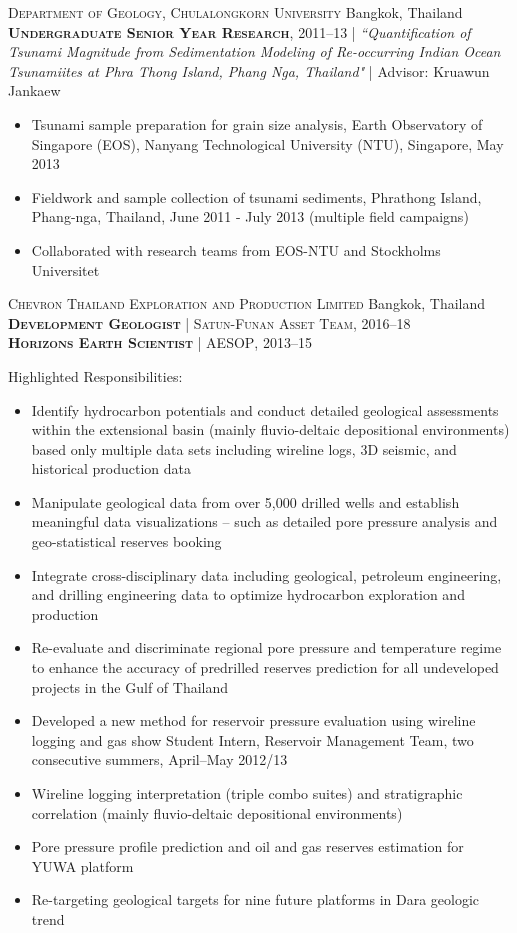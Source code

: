 \documentclass[10pt, letter]{article}
\newcommand{\margintext}[1]{\marginnote{\normalsize\textbf #1 |}}
\begin{document}
\bigskip
\textsc{Department of Geology, Chulalongkorn University} \hfill Bangkok, Thailand \\
\textsc{\textbf{Undergraduate Senior Year Research}}, 2011–13 | \textit{``Quantification of Tsunami Magnitude from Sedimentation Modeling of Re-occurring Indian Ocean Tsunamiites at Phra Thong Island, Phang Nga, Thailand"} | Advisor: Kruawun Jankaew
\begin{itemize}[leftmargin=*]
    \item Tsunami sample preparation for grain size analysis, Earth Observatory of Singapore (EOS), Nanyang Technological University (NTU), Singapore, May 2013
    \item Fieldwork and sample collection of tsunami sediments, Phrathong Island, Phang-nga, Thailand, June 2011 - July 2013 (multiple field campaigns)
    \item Collaborated with research teams from EOS-NTU and Stockholms Universitet
\end{itemize}  

\bigskip
\margintext{Professional Experience}
\textsc{Chevron Thailand Exploration and Production Limited} \hfill Bangkok, Thailand \\
\textsc{\textbf{Development Geologist}} | \textsc{Satun-Funan Asset Team}, 2016–18 \\
\textsc{\textbf{Horizons Earth Scientist}} | \textsc{AESOP}, 2013–15

\bigskip
Highlighted Responsibilities:
\begin{itemize}[leftmargin=*]
    \item Identify hydrocarbon potentials and conduct detailed geological assessments within the extensional basin (mainly fluvio-deltaic depositional environments) based only multiple data sets including wireline logs, 3D seismic, and historical production data
    \item Manipulate geological data from over 5,000 drilled wells and establish meaningful data visualizations – such as detailed pore pressure analysis and geo-statistical reserves booking
    \item Integrate cross-disciplinary data including geological, petroleum engineering, and drilling engineering data to optimize hydrocarbon exploration and production
    \item Re-evaluate and discriminate regional pore pressure and temperature regime to enhance the accuracy of predrilled reserves prediction for all undeveloped projects in the Gulf of Thailand
    \item Developed a new method for reservoir pressure evaluation using wireline logging and gas show
Student Intern, Reservoir Management Team, two consecutive summers, April–May 2012/13
    \item Wireline logging interpretation (triple combo suites) and stratigraphic correlation (mainly fluvio-deltaic depositional environments)
    \item Pore pressure profile prediction and oil and gas reserves estimation for YUWA platform
    \item Re-targeting geological targets for nine future platforms in Dara geologic trend
\end{itemize}
\end{document}
